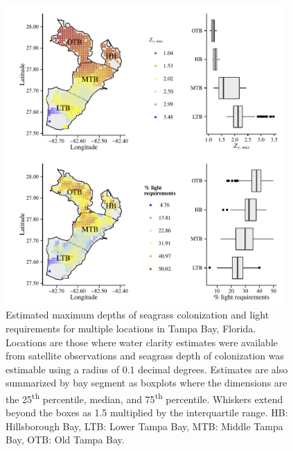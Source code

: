 \documentclass[letterpaper,12pt,oneside]{article}\usepackage[]{graphicx}\usepackage[]{color}
\begin{document}
\begin{figure}
\centering
\includegraphics[width = 0.95\textwidth]{figs/light_tb.pdf}
\caption{Estimated maximum depths of seagrass colonization and light requirements for multiple locations in Tampa Bay, Florida. Locations are those where water clarity estimates were available from satellite observations and seagrass depth of colonization was estimable using a radius of 0.1 decimal degrees.  Estimates are also summarized by bay segment as boxplots where the dimensions are the 25\textsuperscript{th} percentile, median, and 75\textsuperscript{th} percentile.  Whiskers extend beyond the boxes as 1.5 multiplied by the interquartile range. HB: Hillsborough Bay, LTB: Lower Tampa Bay, MTB: Middle Tampa Bay, OTB: Old Tampa Bay.}
\label{fig:light_tb}
\end{figure}

\end{document}
